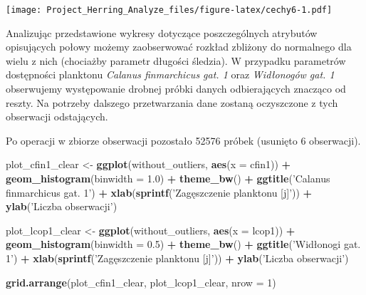 \documentclass[]{article}
\newenvironment{Shaded}{\begin{snugshade}}{\end{snugshade}}
\newcommand{\DataTypeTok}[1]{\textcolor[rgb]{0.13,0.29,0.53}{#1}}
\newcommand{\DecValTok}[1]{\textcolor[rgb]{0.00,0.00,0.81}{#1}}
\newcommand{\FloatTok}[1]{\textcolor[rgb]{0.00,0.00,0.81}{#1}}
\newcommand{\KeywordTok}[1]{\textcolor[rgb]{0.13,0.29,0.53}{\textbf{#1}}}
\newcommand{\NormalTok}[1]{#1}
\newcommand{\OperatorTok}[1]{\textcolor[rgb]{0.81,0.36,0.00}{\textbf{#1}}}
\newcommand{\StringTok}[1]{\textcolor[rgb]{0.31,0.60,0.02}{#1}}
\begin{document}
\texttt{[image: Project\_Herring\_Analyze\_files/figure-latex/cechy6-1.pdf]}

Analizując przedstawione wykresy dotyczące poszczególnych atrybutów
opisujących połowy możemy zaobserwować rozkład zbliżony do normalnego
dla wielu z nich (chociażby parametr długości śledzia). W przypadku
parametrów dostępności planktonu \emph{Calanus finmarchicus gat. 1} oraz
\emph{Widłonogów gat. 1} obserwujemy występowanie drobnej próbki danych
odbierających znacząco od reszty. Na potrzeby dalszego przetwarzania
dane zostaną oczyszczone z tych obserwacji odstających.

\begin{Shaded}
\end{Shaded}

Po operacji w zbiorze obserwacji pozostało 52576 próbek (usunięto 6
obserwacji).

\begin{Shaded}
\begin{Highlighting}[]
\NormalTok{plot_cfin1_clear <-}\StringTok{ }\KeywordTok{ggplot}\NormalTok{(without_outliers, }\KeywordTok{aes}\NormalTok{(}\DataTypeTok{x =}\NormalTok{ cfin1)) }\OperatorTok{+}\StringTok{ }\KeywordTok{geom_histogram}\NormalTok{(}\DataTypeTok{binwidth =} \FloatTok{1.0}\NormalTok{) }\OperatorTok{+}
\StringTok{  }\KeywordTok{theme_bw}\NormalTok{() }\OperatorTok{+}\StringTok{ }\KeywordTok{ggtitle}\NormalTok{(}\StringTok{'Calanus finmarchicus gat. 1'}\NormalTok{) }\OperatorTok{+}\StringTok{ }
\StringTok{  }\KeywordTok{xlab}\NormalTok{(}\KeywordTok{sprintf}\NormalTok{(}\StringTok{'Zagęszczenie planktonu [j]'}\NormalTok{)) }\OperatorTok{+}\StringTok{ }\KeywordTok{ylab}\NormalTok{(}\StringTok{'Liczba obserwacji'}\NormalTok{)}

\NormalTok{plot_lcop1_clear <-}\StringTok{ }\KeywordTok{ggplot}\NormalTok{(without_outliers, }\KeywordTok{aes}\NormalTok{(}\DataTypeTok{x =}\NormalTok{ lcop1)) }\OperatorTok{+}\StringTok{ }\KeywordTok{geom_histogram}\NormalTok{(}\DataTypeTok{binwidth =} \FloatTok{0.5}\NormalTok{) }\OperatorTok{+}
\StringTok{  }\KeywordTok{theme_bw}\NormalTok{() }\OperatorTok{+}\StringTok{ }\KeywordTok{ggtitle}\NormalTok{(}\StringTok{'Widłonogi gat. 1'}\NormalTok{) }\OperatorTok{+}\StringTok{ }
\StringTok{  }\KeywordTok{xlab}\NormalTok{(}\KeywordTok{sprintf}\NormalTok{(}\StringTok{'Zagęszczenie planktonu [j]'}\NormalTok{)) }\OperatorTok{+}\StringTok{ }\KeywordTok{ylab}\NormalTok{(}\StringTok{'Liczba obserwacji'}\NormalTok{)}

\KeywordTok{grid.arrange}\NormalTok{(plot_cfin1_clear, plot_lcop1_clear, }\DataTypeTok{nrow =} \DecValTok{1}\NormalTok{)}
\end{Highlighting}
\end{Shaded}
\end{document}
